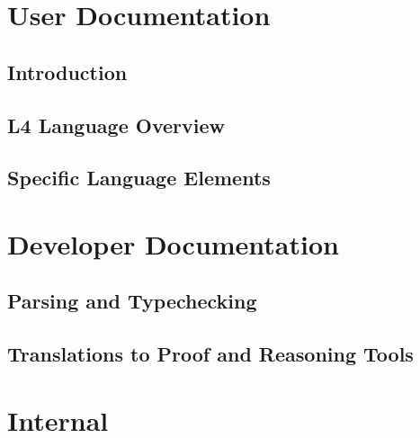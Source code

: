 \documentclass[11pt,a4paper,twoside,headinclude,footexclude]{scrreprt}
\begin{document}




\cleardoublepage


\newpage
\tableofcontents
\listoffigures

\cleardoublepage


\chapter{User Documentation}

\section{Introduction}\label{sec:introduction}



\section{L4 Language Overview}\label{sec:language}


\section{Specific Language Elements}\label{sec:language_elements}


\chapter{Developer Documentation}

\section{Parsing and Typechecking}\label{sec:parsing_typechecking}



\section{Translations to Proof and Reasoning Tools}\label{sec:translations}


\chapter{Internal}


\newpage


\end{document}
